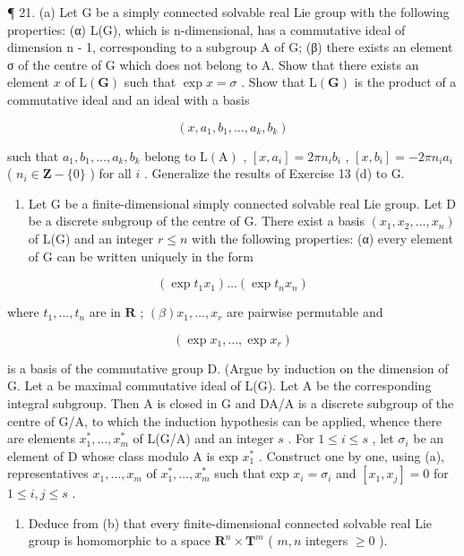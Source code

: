 ¶ 21. (a) Let G be a simply connected solvable real Lie group with the following properties: (α) L(G), which is n-dimensional, has a commutative ideal of dimension n - 1, corresponding to a subgroup A of G; (β) there exists an element σ of the centre of G which does not belong to A. Show that there exists an element \(x\) of \(\mathrm{L}(\mathbf{G})\) such that \(\exp x = \sigma\) . Show that \(\mathrm{L}(\mathbf{G})\) is the product of a commutative ideal and an ideal with a basis

\[
(x, a _ {1}, b _ {1}, \dots , a _ {k}, b _ {k})
\]

such that \(a_1, b_1, \ldots, a_k, b_k\) belong to \(\mathrm{L}(\mathrm{A})\) , \([x, a_i] = 2\pi n_i b_i\) , \([x, b_i] = -2\pi n_i a_i\) ( \(n_i \in \mathbf{Z} - \{0\}\) ) for all \(i\) . Generalize the results of Exercise 13 (d) to G.

\begin{enumerate}
\def\labelenumi{(\alph{enumi})}
\setcounter{enumi}{1}
\tightlist
\item
  Let G be a finite-dimensional simply connected solvable real Lie group. Let D be a discrete subgroup of the centre of G. There exist a basis \((x_{1}, x_{2}, \ldots, x_{n})\) of L(G) and an integer \(r \leqslant n\) with the following properties: (α) every element of G can be written uniquely in the form
\end{enumerate}

\[
\left(\exp t _ {1} x _ {1}\right) \dots \left(\exp t _ {n} x _ {n}\right)
\]

where \(t_1, \ldots, t_n\) are in \(\mathbf{R}\) ; \((\beta)x_1, \ldots, x_r\) are pairwise permutable and

\[
(\exp x _ {1}, \dots , \exp x _ {r})
\]

is a basis of the commutative group D. (Argue by induction on the dimension of G. Let a be maximal commutative ideal of L(G). Let A be the corresponding integral subgroup. Then A is closed in G and DA/A is a discrete subgroup of the centre of G/A, to which the induction hypothesis can be applied, whence there are elements \(x_1^*, \ldots, x_m^*\) of L(G/A) and an integer \(s\) . For \(1 \leqslant i \leqslant s\) , let \(\sigma_i\) be an element of D whose class modulo A is exp \(x_1^*\) . Construct one by one, using (a), representatives \(x_1, \ldots, x_m\) of \(x_1^*, \ldots, x_m^*\) such that exp \(x_i = \sigma_i\) and \([x_1, x_j] = 0\) for \(1 \leqslant i, j \leqslant s\) .

\begin{enumerate}
\def\labelenumi{(\alph{enumi})}
\setcounter{enumi}{2}
\tightlist
\item
  Deduce from (b) that every finite-dimensional connected solvable real Lie group is homomorphic to a space \(\mathbf{R}^n\times \mathbf{T}^m\) ( \(m,n\) integers \(\geqslant 0\) ).
\end{enumerate}

